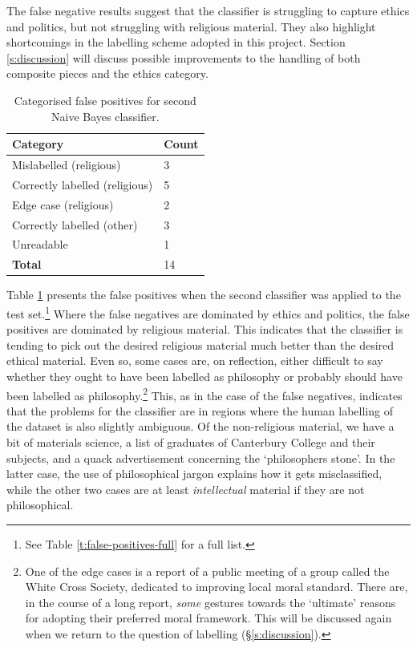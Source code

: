 \documentclass{article}
\begin{document}
The false negative results suggest that the classifier is struggling to capture ethics and politics, but not struggling with religious material. They also highlight shortcomings in the labelling scheme adopted in this project. Section \ref{s:discussion} will discuss possible improvements to the handling of both composite pieces and the ethics category.

\begin{table}[]
        \centering
        \footnotesize
        \begin{tabular}{l|l}
          Category & Count \\
          \hline
          Mislabelled (religious) & 3 \\
          Correctly labelled (religious) & 5\\
          Edge case (religious) & 2 \\
          Correctly labelled (other) & 3 \\
          Unreadable & 1 \\
          \textbf{Total} & 14
        \end{tabular}
        \caption{Categorised false positives for second Naive Bayes classifier.}
        \label{t:false-positives}
\end{table}

Table \ref{t:false-positives} presents the false positives when the second classifier was applied to the test set.\footnote{See Table \ref{t:false-positives-full} for a full list.} Where the false negatives are dominated by ethics and politics, the false positives are dominated by religious material. This indicates that the classifier is tending to pick out the desired religious material much better than the desired ethical material. Even so, some cases are, on reflection, either difficult to say whether they ought to have been labelled as philosophy or probably should have been labelled as philosophy.\footnote{One of the edge cases is a report of a public meeting of a group called the White Cross Society, dedicated to improving local moral standard. There are, in the course of a long report, \emph{some} gestures towards the `ultimate' reasons for adopting their preferred moral framework. This will be discussed again when we return to the question of labelling (\S \ref{s:discussion}).} This, as in the case of the false negatives, indicates that the problems for the classifier are in regions where the human labelling of the dataset is also  slightly ambiguous. Of the non-religious material, we have a bit of materials science, a list of graduates of Canterbury College and their subjects, and a quack advertisement concerning the `philosophers stone'. In the latter case, the use of philosophical jargon explains how it gets misclassified, while the other two cases are at least \emph{intellectual} material if they are not philosophical.
\end{document}
